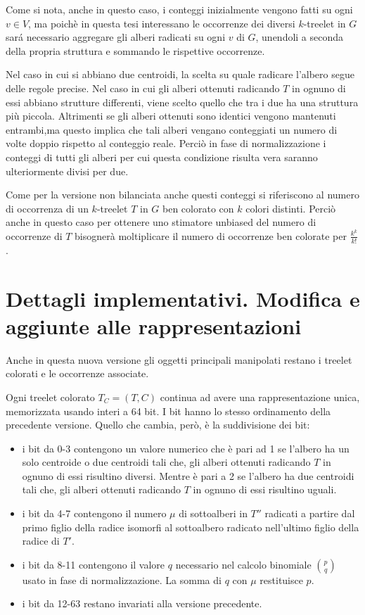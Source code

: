 Come si nota, anche in questo caso, i conteggi inizialmente vengono fatti su ogni $ v \in V $, ma poich\`e in questa tesi interessano le occorrenze dei diversi $ k $-treelet in $ G $  sar\'a necessario aggregare gli alberi radicati su ogni $ v $ di $ G $, unendoli a seconda della propria struttura e sommando le rispettive occorrenze.

Nel caso in cui si abbiano due centroidi, la scelta su quale radicare l'albero segue delle regole precise.
Nel caso in cui gli alberi ottenuti radicando $ T $ in ognuno di essi abbiano strutture differenti, viene scelto quello che tra i due ha una struttura pi\`u piccola.
Altrimenti se gli alberi ottenuti sono identici vengono mantenuti entrambi,ma questo implica che tali alberi vengano conteggiati un numero di volte doppio rispetto al conteggio reale.
Perci\`o in fase di normalizzazione i conteggi di tutti gli alberi per cui questa condizione risulta vera saranno ulteriormente divisi per due.

Come per la versione non bilanciata anche questi conteggi si riferiscono al numero di occorrenza di un $ k $-treelet $ T $ in $ G $ ben colorato con $ k $ colori distinti.
Perciò anche in questo caso per ottenere uno stimatore unbiased del numero di occorrenze di $ T $ bisognerà moltiplicare il numero di occorrenze ben colorate per $ \frac{k^k}{k!} $.


\section{Dettagli implementativi. Modifica e aggiunte alle rappresentazioni}
\label{cap 3:3}
Anche in questa nuova versione gli oggetti principali manipolati restano i treelet colorati e le occorrenze associate.

Ogni treelet colorato $ T_C = (T,C)$ continua ad avere una rappresentazione unica, memorizzata usando interi a 64 bit.
I bit hanno lo stesso ordinamento della precedente versione.
Quello che cambia, per\`o, \`e la suddivisione dei bit:
\begin{itemize}
	\item i bit da 0-3 contengono un valore numerico che \`e pari ad 1 se l'albero ha un solo centroide o due centroidi tali che, gli alberi ottenuti radicando $ T $ in ognuno di essi risultino diversi.
	Mentre \`e pari a  2 se l'albero ha due centroidi tali che, gli alberi ottenuti radicando $ T $ in ognuno di essi risultino uguali.
	\item  i bit da 4-7 contengono il numero $\mu$ di sottoalberi in $ T'' $ radicati a partire dal primo figlio della radice isomorfi al sottoalbero radicato nell'ultimo figlio della radice di $ T' $.
	\item i bit da 8-11 contengono il valore $ q $ necessario nel calcolo binomiale $ \binom{p}{q} $ usato in fase di normalizzazione.
	La somma di $ q $ con $\mu$ restituisce $ p $.
	\item i bit da 12-63 restano invariati alla versione precedente.	  
\end{itemize} 

